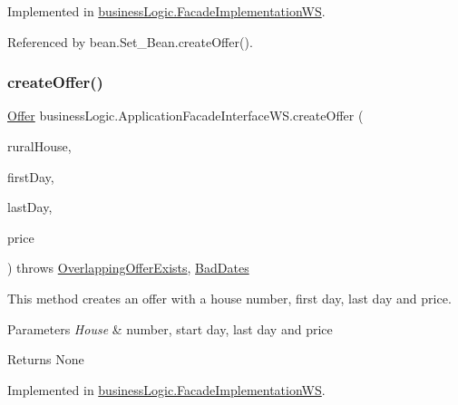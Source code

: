 Implemented in \mbox{\hyperlink{classbusinessLogic_1_1FacadeImplementationWS_a6e8399739161cbb6a2830ebb9279de90}{business\+Logic.\+Facade\+Implementation\+WS}}.



Referenced by bean.\+Set\+\_\+\+Bean.\+create\+Offer().

\mbox{\label{interfacebusinessLogic_1_1ApplicationFacadeInterfaceWS_a0e8d2135ef1384a32e74f60bcea55f09}} 
\subsubsection{\texorpdfstring{createOffer()}{createOffer()}}
{\footnotesize\ttfamily \mbox{\hyperlink{classdomain_1_1Offer}{Offer}} business\+Logic.\+Application\+Facade\+Interface\+W\+S.\+create\+Offer (\begin{DoxyParamCaption}\item[{\mbox{\hyperlink{classdomain_1_1RuralHouse}{Rural\+House}}}]{rural\+House,  }\item[{Date}]{first\+Day,  }\item[{Date}]{last\+Day,  }\item[{float}]{price }\end{DoxyParamCaption}) throws \mbox{\hyperlink{classexceptions_1_1OverlappingOfferExists}{Overlapping\+Offer\+Exists}}, \mbox{\hyperlink{classexceptions_1_1BadDates}{Bad\+Dates}}}



This method creates an offer with a house number, first day, last day and price. 


\begin{DoxyParams}{Parameters}
{\em House} & number, start day, last day and price \\
\hline
\end{DoxyParams}
\begin{DoxyReturn}{Returns}
None 
\end{DoxyReturn}


Implemented in \mbox{\hyperlink{classbusinessLogic_1_1FacadeImplementationWS_ac7b3bdfd0815ea7c787da312de594cce}{business\+Logic.\+Facade\+Implementation\+WS}}.



